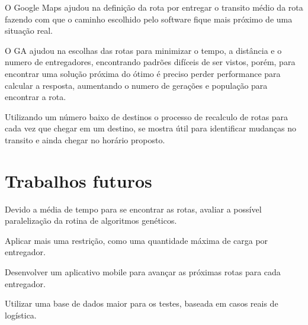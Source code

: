 O Google Maps ajudou na definição da rota por entregar o transito médio da rota fazendo com que o caminho escolhido pelo software fique mais próximo de uma situação real. 

O GA ajudou na escolhas das rotas para minimizar o tempo, a distância e o numero de entregadores, encontrando padrões difíceis de ser vistos, porém, para encontrar uma solução próxima do ótimo é preciso perder performance para calcular a resposta, aumentando o numero de gerações e população para encontrar a rota.

Utilizando um número baixo de destinos o processo de recalculo de rotas para cada vez que chegar em um  destino, se mostra útil para identificar mudanças no transito e ainda chegar no horário proposto.

\section{Trabalhos futuros}

Devido a média de tempo para se encontrar as rotas, avaliar a possível paralelização da rotina de algoritmos genéticos.

Aplicar mais uma restrição, como uma quantidade máxima de carga por entregador.

Desenvolver um aplicativo mobile para avançar as próximas rotas para cada entregador.

Utilizar uma base de dados maior para os testes, baseada em casos reais de logística.